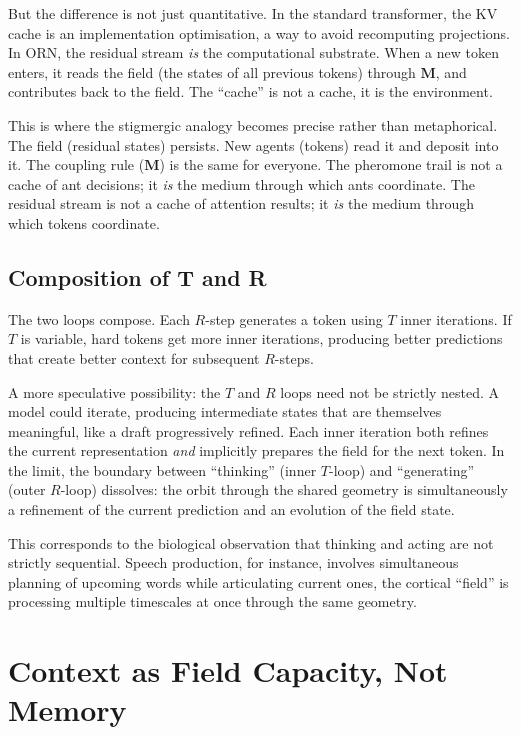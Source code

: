 \documentclass[11pt, a4paper]{article}
\newcommand{\M}{\mathbf{M}}
\theoremstyle{plain}
\theoremstyle{definition}
\theoremstyle{remark}
\begin{document}
But the difference is not just quantitative.
In the standard transformer, the KV cache is an implementation optimisation, a way to avoid recomputing projections.
In ORN, the residual stream \emph{is} the computational substrate.
When a new token enters, it reads the field (the states of all previous tokens) through $\M$, and contributes back to the field.
The ``cache'' is not a cache, it is the environment.

This is where the stigmergic analogy becomes precise rather than metaphorical.
The field (residual states) persists.
New agents (tokens) read it and deposit into it.
The coupling rule ($\M$) is the same for everyone.
The pheromone trail is not a cache of ant decisions; it \emph{is} the medium through which ants coordinate.
The residual stream is not a cache of attention results; it \emph{is} the medium through which tokens coordinate.

\subsection{Composition of T and R}

The two loops compose.
Each $R$-step generates a token using $T$ inner iterations.
If $T$ is variable, hard tokens get more inner iterations, producing better predictions that create better context for subsequent $R$-steps.

A more speculative possibility: the $T$ and $R$ loops need not be strictly nested.
A model could iterate, producing intermediate states that are themselves meaningful, like a draft progressively refined.
Each inner iteration both refines the current representation \emph{and} implicitly prepares the field for the next token.
In the limit, the boundary between ``thinking'' (inner $T$-loop) and ``generating'' (outer $R$-loop) dissolves: the orbit through the shared geometry is simultaneously a refinement of the current prediction and an evolution of the field state.

This corresponds to the biological observation that thinking and acting are not strictly sequential.
Speech production, for instance, involves simultaneous planning of upcoming words while articulating current ones, the cortical ``field'' is processing multiple timescales at once through the same geometry.

\section{Context as Field Capacity, Not Memory}
\end{document}

